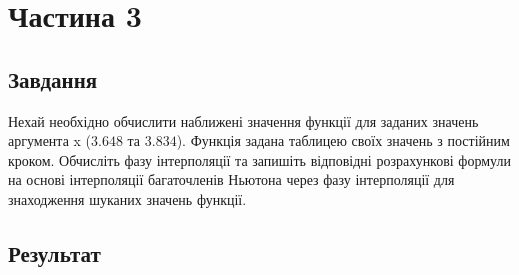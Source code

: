 \section{Частина 3}
\label{sec:task3}

\subsection{Завдання}
\label{subsec:task3_task}

Нехай необхідно обчислити наближені значення функції
для заданих значень аргумента x ($3.648$ та $3.834$).
Функція задана таблицею своїх значень з постійним кроком.
Обчисліть фазу інтерполяції та запишіть відповідні розрахункові
формули на основі інтерполяції багаточленів Ньютона через
фазу інтерполяції для знаходження шуканих значень функції.

\subsection{Результат}
\label{subsec:task3_result}

